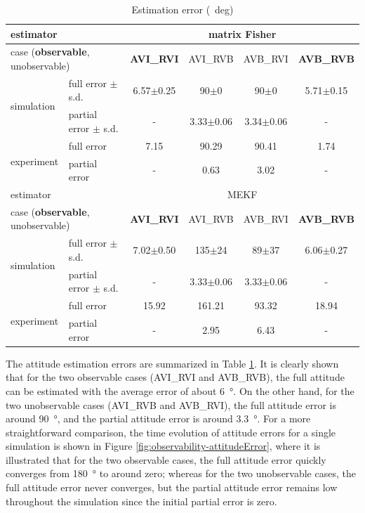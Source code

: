 \begin{table}
	\caption{Estimation error (\SI{}{deg}) \label{table:observability-error}}
	\centering
	\begin{tabular}{l|l|c|c|c|c}
		\hline\hline
		\multicolumn{2}{l|}{estimator} & \multicolumn{4}{c}{matrix Fisher} \\ \hline
		\multicolumn{2}{l|}{case (\textbf{observable}, unobservable)} & \textbf{AVI\_RVI} & AVI\_RVB & AVB\_RVI & \textbf{AVB\_RVB} \\ \hline
		\multirow{2}{*}{simulation} & full error $\pm$ s.d. & 6.57$\pm$0.25 & 90$\pm$0 & 90$\pm$0 & 5.71$\pm$0.15  \\
		& partial error $\pm$ s.d. & - & 3.33$\pm$0.06 & 3.34$\pm$0.06 & - \\ \hline
		\multirow{2}{*}{experiment} & full error & 7.15 & 90.29 & 90.41 & 1.74 \\
		& partial error & - & 0.63 & 3.02 & - \\ \hline\hline
		\multicolumn{2}{l|}{estimator} & \multicolumn{4}{c}{MEKF} \\ \hline
		\multicolumn{2}{l|}{case (\textbf{observable}, unobservable)} & \textbf{AVI\_RVI} & AVI\_RVB & AVB\_RVI & \textbf{AVB\_RVB} \\ \hline
		\multirow{2}{*}{simulation} & full error $\pm$ s.d. & 7.02$\pm$0.50 & 135$\pm$24 & 89$\pm$37 & 6.06$\pm$0.27 \\
		& partial error $\pm$ s.d. & - & 3.33$\pm$0.06 & 3.33$\pm$0.06 & - \\ \hline
		\multirow{2}{*}{experiment} & full error & 15.92 & 161.21 & 93.32 & 18.94 \\
		& partial error  & - & 2.95 & 6.43 & - \\ \hline\hline
	\end{tabular}
\end{table}

The attitude estimation errors are summarized in Table \ref{table:observability-error}.
It is clearly shown that for the two observable cases (AVI\_RVI and AVB\_RVB), the full attitude can be estimated with the average error of about \SI{6}{\degree}.
On the other hand, for the two unobservable cases (AVI\_RVB and AVB\_RVI), the full attitude error is around \SI{90}{\degree}, and the partial attitude error is around \SI{3.3}{\degree}.
For a more straightforward comparison, the time evolution of attitude errors for a single simulation is shown in Figure \ref{fig:observability-attitudeError}, where it is illustrated that for the two observable cases, the full attitude error quickly converges from \SI{180}{\degree} to around zero;
whereas for the two unobservable cases, the full attitude error never converges, but the partial attitude error remains low throughout the simulation since the initial partial error is zero.


